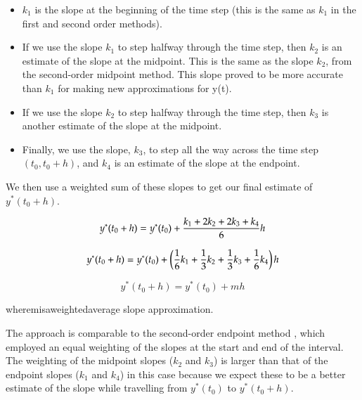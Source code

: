 \begin{itemize}
    \item $k_1$ is the slope at the beginning of the time step (this is the same as $k_1$ in the first and second order methods).
    
\item If we use the slope $k_1$ to step halfway through the time step, then $k_2$ is an estimate of the slope at the midpoint. This is the same as the slope $k_2$, from the second-order midpoint method. This slope proved to be more accurate than $k_1$ for making new approximations for y(t).

\item If we use the slope $k_2$ to step halfway through the time step, then $k_3$ is another estimate of the slope at the midpoint.

\item Finally, we use the slope, $k_3$, to step all the way across the time step$(t_0, t_0+h)$, and $k_4$ is an estimate of the slope at the endpoint. 
\end{itemize}

We then use a weighted sum of these slopes to get our final estimate of $y^*(t_0+h)$.

\begin{equation}
    {y^*}({t_0} + h) = {y^*}({t_0}) + {{{k_1} + 2{k_2} + 2{k_3} + {k_4}} \over 6}h 
\end{equation}



\begin{equation}
   {y^*}({t_0} + h) = {y^*}({t_0}) + \left( {{1 \over 6}{k_1} + {1 \over 3}{k_2} + {1 \over 3}{k_3} + {1 \over 6}{k_4}} \right)h
\end{equation}

\begin{equation}
   {y^*}({t_0} + h) =  {y^*}({t_0}) + mh
\end{equation}

 {\rm{where\;}}m{\rm{\;is\;a\;weighted\;average\; slope\; approximation.}}

The approach is comparable to the second-order endpoint method \cite{dontchev2000second}, which employed an equal weighting of the slopes at the start and end of the interval. The weighting of the midpoint slopes ($k_2$ and $k_3$) is larger than that of the endpoint slopes ($k_1$ and $k_4$) in this case because we expect these to be a better estimate of the slope while travelling from $y^*(t_0)$ to $y^*(t_0+h)$.

\newpage
